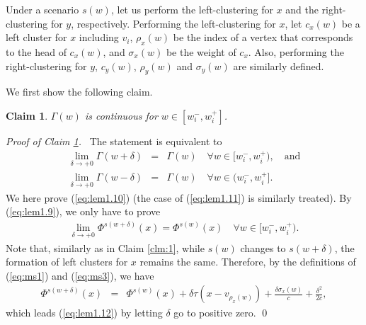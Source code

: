 \documentclass[a4paper]{llncs}
\newtheorem{clm}{Claim}
\begin{document}
Under a scenario $s(w)$, let us perform the left-clustering for $x$ and the right-clustering for $y$, respectively.
Performing the left-clustering for $x$,
let $c_x(w)$ be a left cluster for $x$ including $v_i$, 
$\rho_x(w)$ be the index of a vertex that corresponds to the head of $c_x(w)$,
and $\sigma_x(w)$ be the weight of $c_x$.
Also, performing the right-clustering for $y$, $c_y(w)$, $\rho_y(w)$ and $\sigma_y(w)$ are similarly defined. 

We first show the following claim.
\begin{clm}
$\Gamma(w)$ is continuous for $w \in [w^-_i, w^+_i]$.
\label{clm:4}
\end{clm}
\noindent
{\it Proof of Claim \ref{clm:4}.} \
The statement is equivalent to
\begin{eqnarray}
\lim_{\delta \to +0} \Gamma(w+\delta)	&=&	\Gamma(w) \quad \forall w \in [w^-_i, w^+_i), \quad \mbox{and} \label{eq:lem1.10} \\
\lim_{\delta \to +0} \Gamma(w-\delta)		&=&	\Gamma(w) \quad \forall w \in (w^-_i, w^+_i]. \label{eq:lem1.11}
\end{eqnarray}
We here prove (\ref{eq:lem1.10}) (the case of (\ref{eq:lem1.11}) is similarly treated).
By (\ref{eq:lem1.9}), we only have to prove
\begin{eqnarray}
\lim_{\delta \to +0} \Phi^{s(w+\delta)}(x) = \Phi^{s(w)}(x) \quad \forall w \in [w^-_i, w^+_i).
\label{eq:lem1.12}
\end{eqnarray}
Note that, similarly as in Claim \ref{clm:1}, while $s(w)$ changes to $s(w+\delta)$, 
the formation of left clusters for $x$ remains the same.
Therefore, by the definitions of (\ref{eq:ms1}) and (\ref{eq:ms3}), we have 
\begin{eqnarray}
\Phi^{s(w+\delta)}(x)	&=& \Phi^{s(w)}(x) +  \delta\tau(x - v_{\rho_x(w)}) + \frac{\delta\sigma_x(w)}{c} + \frac{\delta^2}{2c},
\label{eq:lem1.13}
\end{eqnarray}
which leads (\ref{eq:lem1.12}) by letting $\delta$ go to positive zero.
\qed

\medskip
\end{document}
